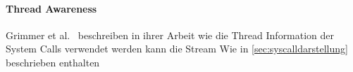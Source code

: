             \paragraph{Thread Awareness}
                Grimmer et al.~\cite{IDSTHREADGRIMMER2021} beschreiben in ihrer Arbeit wie die Thread Information der System Calls verwendet werden kann die Stream 
                Wie in \autoref{sec:syscalldarstellung} beschrieben enthalten  





